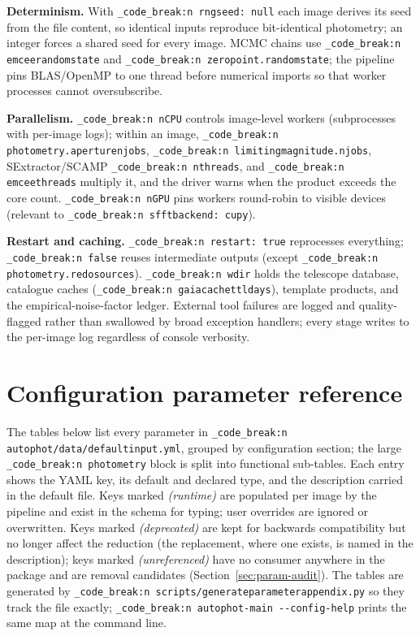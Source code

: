 \documentclass[11pt,a4paper]{article}
\renewcommand{\_}{\autophotunderscore\allowbreak}
\DeclareRobustCommand{\code}[1]{\texttt{\autophot_code_break:n {#1}}}
\begin{document}
\textbf{Determinism.} With \code{rng\_seed: null} each image derives its
seed from the file content, so identical inputs reproduce bit-identical
photometry; an integer forces a shared seed for every image. MCMC chains
use \code{emcee\_random\_state} and \code{zeropoint.random\_state}; the
pipeline pins BLAS/OpenMP to one thread before numerical imports so that
worker processes cannot oversubscribe.

\textbf{Parallelism.} \code{nCPU} controls image-level workers
(subprocesses with per-image logs); within an image,
\code{photometry.aperture\_n\_jobs}, \code{limiting\_magnitude.n\_jobs},
SExtractor/SCAMP \code{nthreads}, and \code{emcee\_threads} multiply it,
and the driver warns when the product exceeds the core count.
\code{nGPU} pins workers round-robin to visible devices (relevant to
\code{sfft\_backend: cupy}).

\textbf{Restart and caching.} \code{restart: true} reprocesses everything;
\code{false} reuses intermediate outputs (except
\code{photometry.redo\_sources}). \code{wdir} holds the telescope
database, catalogue caches (\code{gaia\_cache\_ttl\_days}), template
products, and the empirical-noise-factor ledger. External tool failures
are logged and quality-flagged rather than swallowed by broad exception
handlers; every stage writes to the per-image log regardless of console
verbosity.

\appendix
\section{Configuration parameter reference}
\label{app:params}

The tables below list every parameter in
\code{autophot/data/default\_input.yml}, grouped by configuration
section; the large \code{photometry} block is split into functional
sub-tables. Each entry shows the YAML key, its default and declared type,
and the description carried in the default file. Keys marked
\emph{(runtime)} are populated per image by the pipeline and exist in the
schema for typing; user overrides are ignored or overwritten. Keys marked
\emph{(deprecated)} are kept for backwards compatibility but no longer
affect the reduction (the replacement, where one exists, is named in the
description); keys marked \emph{(unreferenced)} have no consumer anywhere
in the package and are removal candidates (Section~\ref{sec:param-audit}).
The tables are generated by \code{scripts/generate\_parameter\_appendix.py} so they
track the file exactly; \code{autophot-main -{}-config-help} prints the
same map at the command line.
\end{document}
